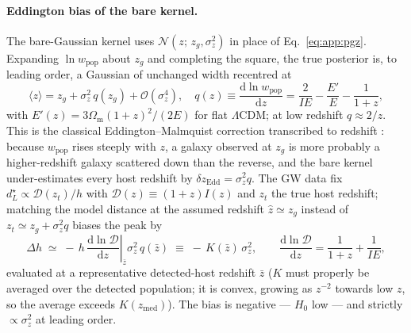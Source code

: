 \paragraph*{Eddington bias of the bare kernel.}
The bare-Gaussian kernel uses $\mathcal{N}(z;\,z_g,\sigma_z^2)$ in place of
Eq.~\eqref{eq:app:pgz}. Expanding $\ln w_\mathrm{pop}$ about $z_g$ and
completing the square, the true posterior is, to leading order, a Gaussian of
unchanged width recentred at
\begin{equation}
  \langle z \rangle = z_g + \sigma_z^2\, q(z_g) + \mathcal{O}(\sigma_z^4),
  \quad
  q(z) \equiv \frac{\mathrm{d}\ln w_\mathrm{pop}}{\mathrm{d}z}
  = \frac{2}{I E} - \frac{E'}{E} - \frac{1}{1+z},
  \label{eq:app:eddz}
\end{equation}
with $E'(z) = 3\Omega_\mathrm{m}(1+z)^2/(2E)$ for flat $\Lambda$CDM; at low
redshift $q \approx 2/z$. This is the classical Eddington--Malmquist
correction transcribed to redshift
\citep{Eddington1913}:
because $w_\mathrm{pop}$ rises steeply with $z$, a galaxy observed at $z_g$ is
more probably a higher-redshift galaxy scattered down than the reverse, and
the bare kernel under-estimates every host redshift by
$\delta z_\mathrm{Edd} = \sigma_z^2 q$. The GW data fix
$d_L^\star \propto \mathcal{D}(z_t)/h$ with $\mathcal{D}(z) \equiv (1+z)I(z)$ and $z_t$ the true
host redshift; matching the model distance at the assumed redshift
$\hat z \simeq z_g$ instead of $z_t \simeq z_g + \sigma_z^2 q$ biases the
peak by
\begin{equation}
  \Delta h \;\simeq\; -\,h\,
  \left.\frac{\mathrm{d}\ln \mathcal{D}}{\mathrm{d}z}\right|_{\bar z}
  \sigma_z^2\, q(\bar z)
  \;\equiv\; -\,K(\bar z)\,\sigma_z^2 ,
  \qquad
  \frac{\mathrm{d}\ln \mathcal{D}}{\mathrm{d}z} = \frac{1}{1+z} + \frac{1}{IE},
  \label{eq:app:dhlaw}
\end{equation}
evaluated at a representative detected-host redshift $\bar z$ ($K$ must
properly be averaged over the detected population; it is convex, growing as
$z^{-2}$ towards low $z$, so the average exceeds $K(z_\mathrm{med})$). The bias
is negative --- $H_0$ low --- and strictly $\propto \sigma_z^2$ at leading
order.


